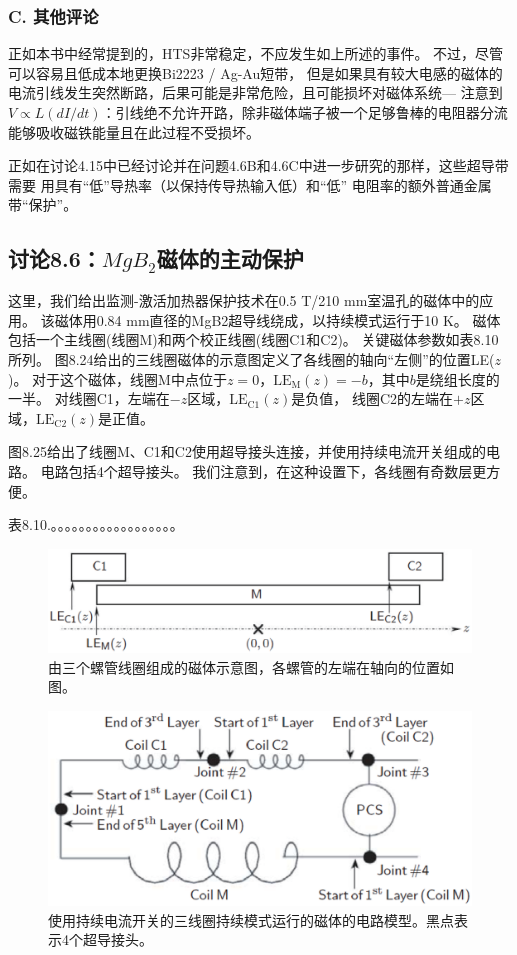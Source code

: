 \subsubsection*{C. 其他评论}
正如本书中经常提到的，HTS非常稳定，不应发生如上所述的事件。
不过，尽管可以容易且低成本地更换Bi2223 / Ag-Au短带，
但是如果具有较大电感的磁体的电流引线发生突然断路，后果可能是非常危险，且可能损坏对磁体系统---
注意到$V\propto L(dI/dt)$：引线绝不允许开路，除非磁体端子被一个足够鲁棒的电阻器分流能够吸收磁铁能量且在此过程不受损坏。

正如在讨论4.15中已经讨论并在问题4.6B和4.6C中进一步研究的那样，这些超导带需要
用具有“低”导热率（以保持传导热输入低）和“低” 电阻率的额外普通金属带“保护”。



\subsection{讨论8.6：$MgB_2$磁体的主动保护}
这里，我们给出监测-激活加热器保护技术在0.5 T/210 mm室温孔的磁体中的应用。
该磁体用0.84 mm直径的MgB2超导线绕成，以持续模式运行于10 K。
磁体包括一个主线圈(线圈M)和两个校正线圈(线圈C1和C2)。
关键磁体参数如表8.10所列。
图8.24给出的三线圈磁体的示意图定义了各线圈的轴向“左侧”的位置LE($z$)。
对于这个磁体，线圈M中点位于$z=0$，$\mathrm{LE_M}(z)=-b$，其中$b$是绕组长度的一半。
对线圈C1，左端在$-z$区域，$\mathrm{LE_{C1}}(z)$是负值，
线圈C2的左端在$+z$区域，$\mathrm{LE_{C2}}(z)$是正值。

图8.25给出了线圈M、C1和C2使用超导接头连接，并使用持续电流开关组成的电路。
电路包括4个超导接头。
我们注意到，在这种设置下，各线圈有奇数层更方便。

表8.10.。。。。。。。。。。。。。。。。。。


\begin{figure}
	\centering
	\includegraphics[scale=0.5]{chpt8/figs/fig8.24.eps}
	\caption{由三个螺管线圈组成的磁体示意图，各螺管的左端在轴向的位置如图。}
\end{figure}


\begin{figure}
	\centering
	\includegraphics[scale=0.5]{chpt8/figs/fig8.25.eps}
	\caption{使用持续电流开关的三线圈持续模式运行的磁体的电路模型。黑点表示4个超导接头。}
\end{figure}

